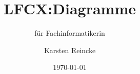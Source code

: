 \documentclass[]{beamer}
\title{LFCX:Diagramme}
\subtitle{für Fachinformatikerin}
\institute[GS-LDK]{Gewerbliche Schulen Dillenburg}
\author{Karsten Reincke}
\date{\today}
\def\cfgGl{../../../cfg.gl/}
\begin{document}

\begin{frame}
  \titlepage

  
\end{frame}






\logo{}
\newpage



%
\end{document}
